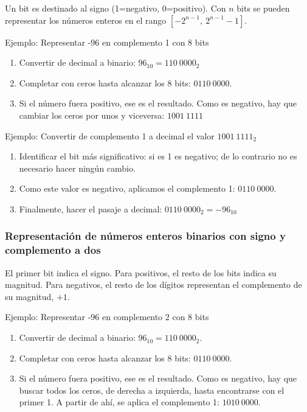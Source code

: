 \documentclass{article}
\begin{document}
Un bit es destinado al signo (1=negativo, 0=positivo). Con $n$ bits se pueden 
representar los números enteros en el rango $[-2^{n-1},\ 2^{n-1}-1]$.

Ejemplo: Representar -96 en complemento 1 con 8 bits
\begin{enumerate}
    \item Convertir de decimal a binario: $96_{10} = 110\ 0000_{2}$
    \item Completar con ceros hasta alcanzar los 8 bits: $0110\ 0000$.
    \item Si el número fuera positivo, ese es el resultado. Como es 
    negativo, hay que cambiar los ceros por unos y viceversa: 
    $1001\ 1111$
\end{enumerate}

Ejemplo: Convertir de complemento 1 a decimal el valor $1001\ 1111_{2}$
\begin{enumerate}
    \item Identificar el bit más significativo: si es 1 es negativo; de lo 
    contrario no es necesario hacer ningún cambio.
    \item Como este valor es negativo, aplicamos el complemento 1: $0110\ 0000$.
    \item Finalmente, hacer el pasaje a decimal: $0110\ 0000_{2} = -96_{10}$
\end{enumerate}

\subsubsection{Representación de números enteros binarios con signo y 
complemento a dos}

El primer bit indica el signo. Para positivos, el resto de los bits indica su
magnitud. Para negativos, el resto de los dígitos representan el complemento de
su magnitud, $+1$.

Ejemplo: Representar -96 en complemento 2 con 8 bits
\begin{enumerate}
    \item Convertir de decimal a binario: $96_{10} = 110\ 0000_{2}$.
    \item Completar con ceros hasta alcanzar los 8 bits: $0110\ 0000$.
    \item Si el número fuera positivo, ese es el resultado. Como es 
    negativo, hay que buscar todos los ceros, de derecha a izquierda, 
    hasta encontrarse con el primer 1. A partir de ahí, se aplica el 
    complemento 1: $1010\ 0000$.
\end{enumerate}
\end{document}
